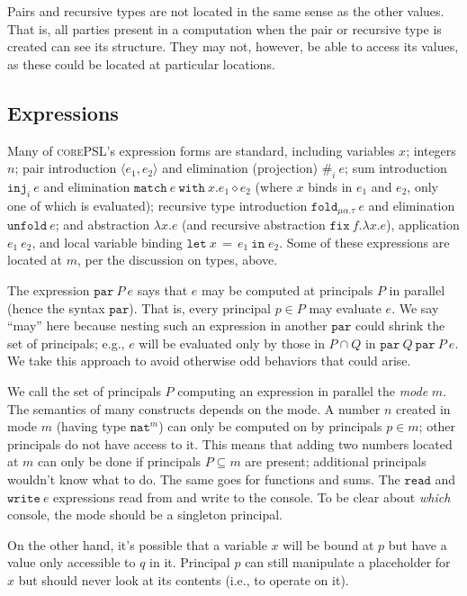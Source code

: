 \documentclass[10pt]{article}
\newcommand{\kw}[1]{\ensuremath{\mathtt{#1}}}
\newcommand{\tnat}{\ensuremath{\mathtt{nat}}}
\newcommand{\trec}[2]{\ensuremath{\mu {#1}.{#2}}}
\newcommand{\elet}[3]{\ensuremath{\kw{let}~#1\, =\, #2~\kw{in}\;{#3}}}
\newcommand{\epar}[2]{\ensuremath{\kw{par}~{#1}~{#2}}}
\newcommand{\econd}[3]{\ensuremath{\kw{match}~{#1}~\kw{with}~x.{#2} \diamond {#3}}}
\newcommand{\einj}[2]{\ensuremath{\kw{inj}_{#1}~{#2}}}
\newcommand{\eread}{\ensuremath{\kw{read}}}
\newcommand{\ewrite}[1]{\ensuremath{\kw{write}~{#1}}}
\newcommand{\epair}[2]{\ensuremath{\langle {#1}, {#2} \rangle}}
\newcommand{\eproj}[2]{\ensuremath{\kw{\#}}_{#1}~{#2}}
\newcommand{\elam}[2]{\ensuremath{\lambda {#1}.{#2}}}
\newcommand{\eapp}[2]{\ensuremath{{#1}~{#2}}}
\newcommand{\efix}[3]{\ensuremath{\kw{fix}~{#1}.\elam{#2}{#3}}}
\newcommand{\efold}[2]{\ensuremath{\kw{fold}_{#1}~{#2}}}
\newcommand{\eunfold}[1]{\ensuremath{\kw{unfold}~{#1}}}
\newcommand{\lang}{\textsc{corePSL}\xspace}
\begin{document}
Pairs and recursive types are not located in the same sense as the
other values. That is, all parties present in a computation when the
pair or recursive type is created can see its structure. They may not, however,
be able to access its values, as these could be located at particular
locations.

\subsection{Expressions}

Many of \lang's expression forms are standard, including
variables $x$; integers $n$; pair introduction $\epair{e_1}{e_2}$ and
elimination (projection) $\eproj{i}{e}$; sum introduction
$\einj{i}{e}$ and elimination $\econd{e}{e_1}{e_2}$ (where $x$ binds
in $e_1$ and $e_2$, only one of which is evaluated); recursive type
introduction $\efold{\trec{\alpha}{\tau}}{e}$ and elimination
$\eunfold{e}$; and abstraction $\elam{x}{e}$ (and recursive
abstraction $\efix{f}{x}{e}$), application $\eapp{e_1}{e_2}$, and
local variable binding $\elet{x}{e_1}{e_2}$. Some of these expressions
are located at $m$, per the discussion on types, above.

The expression $\epar{P}{e}$ says that $e$ may be computed at
principals $P$ in parallel (hence the syntax $\kw{par}$). That is,
every principal $p \in P$ may evaluate $e$. We say ``may'' here
because nesting such an expression in another $\kw{par}$ could shrink
the set of principals; e.g., $e$ will be evaluated only by those in
$P \cap Q$ in $\epar{Q}{\epar{P}{e}}$. We take this approach to avoid
otherwise odd behaviors that could arise.

We call the set of principals $P$ computing an expression in parallel
the \emph{mode} $m$. The semantics of many constructs depends on the
mode. A number $n$ created in mode $m$ (having type $\tnat^m$) can
only be computed on by principals $p \in m$; other principals do not
have access to it. This means that adding two numbers located at $m$
can only be done if principals $P \subseteq m$ are present; additional
principals wouldn't know what to do. The same goes for functions and
sums. The $\eread$ and $\ewrite{e}$ expressions read from and write to
the console. To be clear about \emph{which} console, the mode should
be a singleton principal.

On the other hand, it's possible that a variable $x$ will be bound at
$p$ but have a value only accessible to $q$ in it. Principal $p$ can
still manipulate a placeholder for $x$ but should never look at its
contents (i.e., to operate on it).
\end{document}
